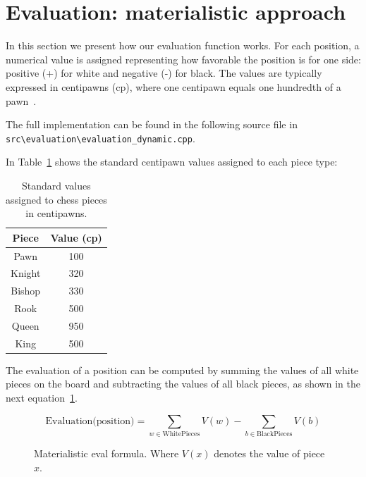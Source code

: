 \section{Evaluation: materialistic approach}
\label{sec:evaluation}

In this section we present how our evaluation function works. For each position, a numerical value is assigned representing how favorable the position is for one side: positive (+) for white and negative (-) for black. The values are typically expressed in centipawns (cp), where one centipawn equals one hundredth of a pawn~\cite{Shannon1950}.

\vspace{1em}

\noindent \parbox{\textwidth}{The full implementation can be found in the following source file in \texttt{src\textbackslash{}evaluation\textbackslash{}evaluation\_dynamic.cpp}.}

\vspace{1em}

\noindent In Table~\ref{tab:piece-values} shows the standard centipawn values assigned to each piece type:

\begin{table}[H]
    \centering
    \begin{tabular}{|c|c|}
        \hline
        Piece & Value (cp)\\ \hline
        Pawn & 100 \\ \hline
        Knight & 320 \\ \hline
        Bishop & 330 \\ \hline
        Rook & 500 \\ \hline
        Queen & 950 \\ \hline
        King & 500 \\ \hline
    \end{tabular}
    \caption{Standard values assigned to chess pieces in centipawns.}
    \label{tab:piece-values}
\end{table}

\noindent The evaluation of a position can be computed by summing the values of all white pieces on the board and subtracting the values of all black pieces, as shown in the next equation~\ref{fig:materialEvalEquation}.

\begin{figure}[H]
    \centering
    \begin{minipage}{0.8\linewidth}
        \centering
        \begin{equation*}
            \text{Evaluation(position)} = \sum_{w \in \text{WhitePieces}} V(w) - \sum_{b \in \text{BlackPieces}} V(b)
        \end{equation*}
        \vspace{-1em}
    \end{minipage}
    \caption{Materialistic eval formula. Where $V(x)$ denotes the value of piece $x$.}
    \label{fig:materialEvalEquation}
\end{figure}

